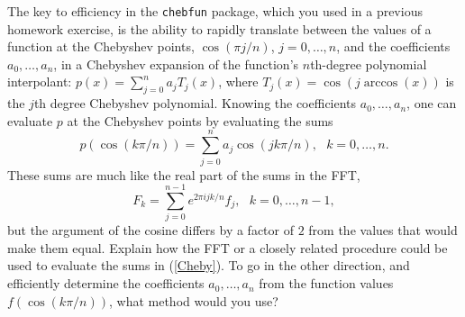 \documentclass[10pt]{article}
\begin{document}
\begin{problem}[Problem 4]
The key to efficiency in the \verb+chebfun+ package, which you used in a previous homework
exercise, is the ability to rapidly translate between the values of a function at the
Chebyshev points, \( \cos ( \pi j/n ) \), \( j=0, \ldots , n \), and the coefficients \( a_0 , \ldots , a_n \),
in a Chebyshev expansion of the function's \( n \)th-degree polynomial interpolant:
\( p(x) = \sum_{j=0}^n a_j T_j (x) \), where \( T_j (x) = \cos ( j \arccos (x) ) \) is the \( j \)th
degree Chebyshev polynomial.  Knowing the coefficients \( a_0 , \ldots , a_n \), one can evaluate
\( p \) at the Chebyshev points by evaluating the sums
\begin{equation}
p ( \cos ( k \pi / n ) ) = \sum_{j=0}^n a_j \cos ( j k \pi / n ) ,~~~k=0, \ldots , n.
\label{Cheby}
\end{equation}
These sums are much like the real part of the sums in the FFT,
\[
F_k = \sum_{j=0}^{n-1} e^{2 \pi i j k / n} f_j ,~~~k=0, \ldots , n-1 ,
\]
but the argument of the cosine differs by a factor of \( 2 \) from the values that would make
them equal.  Explain how the FFT or a closely related procedure could be used to evaluate
the sums in (\ref{Cheby}).  To go in the other direction, and efficiently determine the coefficients
\( a_0 , \ldots , a_n \) from the function values \( f( \cos ( k \pi / n ) ) \), what method would you use?
\end{problem}
\end{document}
